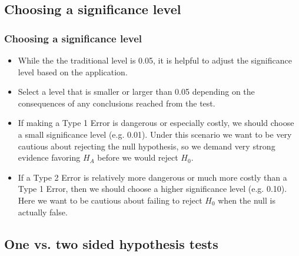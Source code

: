 
\subsection{Choosing a significance level}


\begin{frame}
\frametitle{Choosing a significance level}

\begin{itemize}

\item While the the traditional level is 0.05, it is helpful to adjust the significance level based on the application. 

\item Select a level that is smaller or larger than 0.05 depending on the consequences of any conclusions reached from the test.

\item If making a Type 1 Error is dangerous or especially costly, we should choose a small significance level (e.g. 0.01). Under this scenario we want to be very cautious about rejecting the null hypothesis, so we demand very strong evidence favoring $H_A$ before we would reject $H_0$.

\item If a Type 2 Error is relatively more dangerous or much more costly than a Type 1 Error, then we should choose a higher significance level (e.g. 0.10). Here we want to be cautious about failing to reject $H_0$ when the null is actually false.

\end{itemize}

\end{frame}

 
\subsection{One vs. two sided hypothesis tests}
 
 
